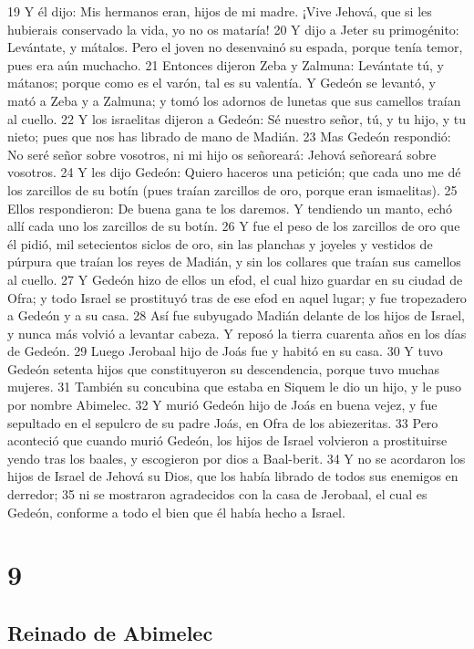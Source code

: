 19 Y él dijo: Mis hermanos eran, hijos de mi madre. ¡Vive Jehová, que si les hubierais conservado la vida, yo no os mataría!
20 Y dijo a Jeter su primogénito: Levántate, y mátalos. Pero el joven no desenvainó su espada, porque tenía temor, pues era aún muchacho.
21 Entonces dijeron Zeba y Zalmuna: Levántate tú, y mátanos; porque como es el varón, tal es su valentía. Y Gedeón se levantó, y mató a Zeba y a Zalmuna; y tomó los adornos de lunetas que sus camellos traían al cuello.
22 Y los israelitas dijeron a Gedeón: Sé nuestro señor, tú, y tu hijo, y tu nieto; pues que nos has librado de mano de Madián.
23 Mas Gedeón respondió: No seré señor sobre vosotros, ni mi hijo os señoreará: Jehová señoreará sobre vosotros.
24 Y les dijo Gedeón: Quiero haceros una petición; que cada uno me dé los zarcillos de su botín (pues traían zarcillos de oro, porque eran ismaelitas).
25 Ellos respondieron: De buena gana te los daremos. Y tendiendo un manto, echó allí cada uno los zarcillos de su botín.
26 Y fue el peso de los zarcillos de oro que él pidió, mil setecientos siclos de oro,  sin las planchas y joyeles y vestidos de púrpura que traían los reyes de Madián, y sin los collares que traían sus camellos al cuello.
27 Y Gedeón hizo de ellos un efod, el cual hizo guardar en su ciudad de Ofra; y todo Israel se prostituyó tras de ese efod en aquel lugar; y fue tropezadero a Gedeón y a su casa.
28 Así fue subyugado Madián delante de los hijos de Israel, y nunca más volvió a levantar cabeza. Y reposó la tierra cuarenta años en los días de Gedeón.
29 Luego Jerobaal hijo de Joás fue y habitó en su casa.
30 Y tuvo Gedeón setenta hijos que constituyeron su descendencia, porque tuvo muchas mujeres.
31 También su concubina que estaba en Siquem le dio un hijo, y le puso por nombre Abimelec.
32 Y murió Gedeón hijo de Joás en buena vejez, y fue sepultado en el sepulcro de su padre Joás, en Ofra de los abiezeritas.
33 Pero aconteció que cuando murió Gedeón, los hijos de Israel volvieron a prostituirse yendo tras los baales, y escogieron por dios a Baal-berit.
34 Y no se acordaron los hijos de Israel de Jehová su Dios, que los había librado de todos sus enemigos en derredor;
35 ni se mostraron agradecidos con la casa de Jerobaal, el cual es Gedeón, conforme a todo el bien que él había hecho a Israel.

\chapter{9}

\section*{Reinado de Abimelec}

